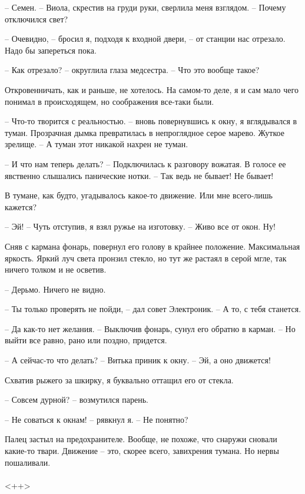 \documentclass[a4paper]{book}
\begin{document}
-- Семен. -- Виола, скрестив на груди руки, сверлила меня взглядом. -- Почему отключился свет?

-- Очевидно, -- бросил я, подходя к входной двери, -- от станции нас отрезало. Надо бы запереться пока.

-- Как отрезало? -- округлила глаза медсестра. -- Что это вообще такое?

Откровенничать, как и раньше, не хотелось. На самом-то деле, я и сам мало чего понимал в происходящем, но соображения все-таки были.

-- Что-то творится с реальностью. -- вновь повернувшись к окну, я вглядывался в туман. Прозрачная дымка превратилась в непроглядное серое марево. Жуткое зрелище. -- А туман этот никакой нахрен не туман.

-- И что нам теперь делать? -- Подключилась к разговору вожатая. В голосе ее явственно слышались панические нотки. -- Так ведь не бывает! Не бывает!

В тумане, как будто, угадывалось какое-то движение. Или мне всего-лишь кажется?

-- Эй! -- Чуть отступив, я взял ружье на изготовку. -- Живо все от окон. Ну!

Сняв с кармана фонарь, повернул его голову в крайнее положение. Максимальная яркость. Яркий луч света пронзил стекло, но тут же растаял в серой мгле, так ничего толком и не осветив.

-- Дерьмо. Ничего не видно.

-- Ты только проверять не пойди, -- дал совет Электроник. -- А то, с тебя станется. 

-- Да как-то нет желания. -- Выключив фонарь, сунул его обратно в карман. -- Но выйти все равно, рано или поздно, придется. 

-- А сейчас-то что делать? -- Витька приник к окну. -- Эй, а оно движется!

Схватив рыжего за шкирку, я буквально оттащил его от стекла. 

-- Совсем дурной? -- возмутился парень.

-- Не соваться к окнам! -- рявкнул я. -- Не понятно? 

Палец застыл на предохранителе. Вообще, не похоже, что снаружи сновали какие-то твари. Движение -- это, скорее всего, завихрения тумана. Но нервы пошаливали.  

\paragraph{}<++>
\end{document}
